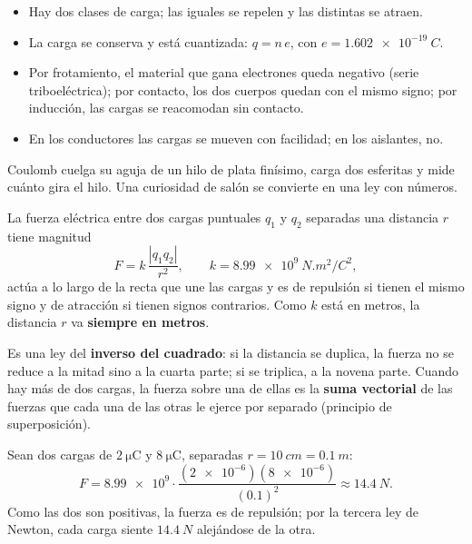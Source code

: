 \documentclass[11pt]{article}
\begin{document}
\begin{resumen}
\begin{itemize}
  \item Hay dos clases de carga; las iguales se repelen y las distintas se atraen.
  \item La carga se conserva y está cuantizada: $q = n\,e$, con
        $e = \qty{1,602e-19}{C}$.
  \item Por frotamiento, el material que gana electrones queda negativo (serie
        triboeléctrica); por contacto, los dos cuerpos quedan con el mismo
        signo; por inducción, las cargas se reacomodan sin contacto.
  \item En los conductores las cargas se mueven con facilidad; en los
        aislantes, no.
\end{itemize}
\end{resumen}

\label{tema:coulomb}

\begin{hilo}
Coulomb cuelga su aguja de un hilo de plata finísimo, carga dos esferitas y
mide cuánto gira el hilo. Una curiosidad de salón se convierte en una ley con
números.
\end{hilo}

\begin{definicion}
La fuerza eléctrica entre dos cargas puntuales $q_1$ y $q_2$ separadas una
distancia $r$ tiene magnitud
\[
  F = k\,\frac{|q_1 q_2|}{r^{2}}, \qquad k = \qty{8,99e9}{N.m^2/C^2},
\]
actúa a lo largo de la recta que une las cargas y es de repulsión si tienen el
mismo signo y de atracción si tienen signos contrarios. Como $k$ está en
metros, la distancia $r$ va \textbf{siempre en metros}.
\end{definicion}

Es una ley del \textbf{inverso del cuadrado}: si la distancia se duplica, la
fuerza no se reduce a la mitad sino a la cuarta parte; si se triplica, a la
novena parte. Cuando hay más de dos cargas, la fuerza sobre una de ellas es la
\textbf{suma vectorial} de las fuerzas que cada una de las otras le ejerce por
separado (principio de superposición).

\begin{ejemplo}
Sean dos cargas de $\qty{2}{\micro\coulomb}$ y $\qty{8}{\micro\coulomb}$,
separadas $r = \qty{10}{cm} = \qty{0,1}{m}$:
\[
  F = \num{8,99e9}\cdot\frac{(\num{2e-6})(\num{8e-6})}{(\num{0,1})^{2}}
    \approx \qty{14,4}{N}.
\]
Como las dos son positivas, la fuerza es de repulsión; por la tercera ley de
Newton, cada carga siente $\qty{14,4}{N}$ alejándose de la otra.
\end{ejemplo}
\end{document}
